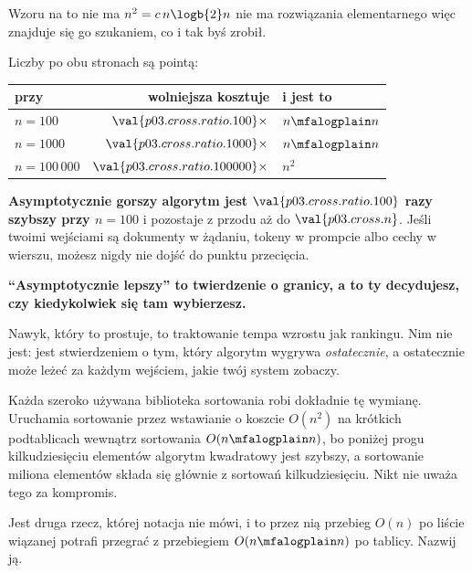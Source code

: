 \begin{fr}

Wzoru na to nie ma \dash{} $n^{2} = c\,n\logb{2} n$ nie ma rozwiązania
elementarnego \dash{} więc znajduje się go szukaniem, co i tak byś zrobił.

Liczby po obu stronach są pointą:

\begin{center}
\begin{tabular}{lrl}
\toprule
przy & wolniejsza kosztuje & i jest to \\
\midrule
$n = 100$ & $\val{p03.cross.ratio.100}\times$ & $n \mfalogplain n$ \\
$n = 1000$ & $\val{p03.cross.ratio.1000}\times$ & $n \mfalogplain n$ \\
$n = 100\,000$ & $\val{p03.cross.ratio.100000}\times$ & $n^{2}$ \\
\bottomrule
\end{tabular}
\end{center}

\textbf{Asymptotycznie gorszy algorytm jest
$\val{p03.cross.ratio.100}$ razy szybszy przy $n = 100$} i pozostaje z przodu
aż do $\val{p03.cross.n}$. Jeśli twoimi wejściami są dokumenty w żądaniu,
tokeny w prompcie albo cechy w wierszu, możesz nigdy nie dojść do punktu
przecięcia.
\end{fr}


\begin{fr}
\begin{trapbox}
\textbf{\enquote{Asymptotycznie lepszy} to twierdzenie o granicy, a to ty
decydujesz, czy kiedykolwiek się tam wybierzesz.}

Nawyk, który to prostuje, to traktowanie tempa wzrostu jak rankingu. Nim nie
jest: jest stwierdzeniem o tym, który algorytm wygrywa \emph{ostatecznie}, a
ostatecznie może leżeć za każdym wejściem, jakie twój system zobaczy.

Każda szeroko używana biblioteka sortowania robi dokładnie tę wymianę.
Uruchamia sortowanie przez wstawianie o koszcie $O(n^{2})$ na krótkich
podtablicach wewnątrz sortowania $O(n \mfalogplain n)$, bo poniżej progu kilkudziesięciu
elementów algorytm kwadratowy jest szybszy, a sortowanie miliona elementów
składa się głównie z sortowań kilkudziesięciu. Nikt nie uważa tego za
kompromis.
\end{trapbox}

Jest druga rzecz, której notacja nie mówi, i to przez nią przebieg $O(n)$ po
liście wiązanej potrafi przegrać z przebiegiem $O(n \mfalogplain n)$ po tablicy.
Nazwij ją.
\dotline
\nextframe
\end{fr}


